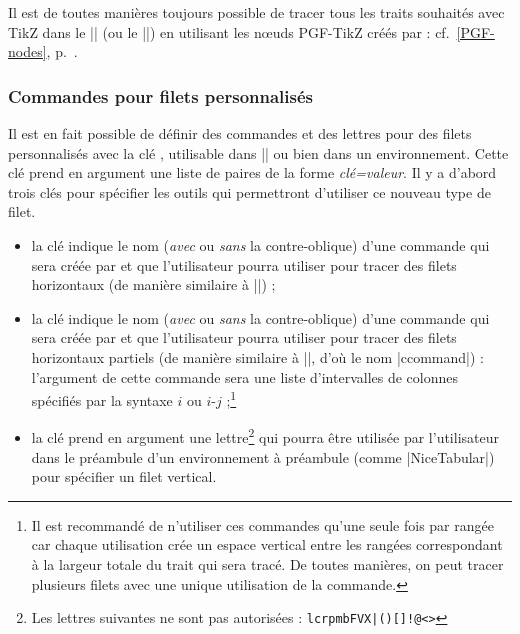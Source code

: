 \documentclass[dvipsnames]{article}
\begin{document}
\medskip
Il est de toutes manières toujours possible de tracer tous les traits souhaités
avec TikZ dans le |\CodeAfter| (ou le |\CodeBefore|) en utilisant les nœuds
PGF-TikZ créés par  : cf.~\ref{PGF-nodes}, p.~\pageref{PGF-nodes}.

\subsubsection{Commandes pour filets personnalisés}
\label{custom-line}


Il est en fait possible de définir des commandes et des lettres pour des filets
personnalisés avec la clé , utilisable dans
|\NiceMatrixOptions| ou bien dans un environnement. Cette clé prend en argument
une liste de paires de la forme \textsl{clé=valeur}. Il y a d'abord trois clés
pour spécifier les outils qui permettront d'utiliser ce nouveau type de filet.

\begin{itemize}
\item la clé  indique le nom (\emph{avec} ou \emph{sans} la
contre-oblique) d'une commande qui sera créée par  et que
l'utilisateur pourra utiliser pour tracer des filets horizontaux (de manière
similaire à |\hline|) ;

\item la clé  indique le nom (\emph{avec} ou \emph{sans} la
contre-oblique) d'une commande qui sera créée par  et que
l'utilisateur pourra utiliser pour tracer des filets horizontaux partiels (de
manière similaire à |\cline|, d'où le nom |ccommand|) : l'argument de cette
commande sera une liste d'intervalles de colonnes spécifiés par la syntaxe $i$ ou
$i$-$j$ ;\footnote{Il est recommandé de n'utiliser ces commandes qu'une seule
  fois par rangée car chaque utilisation crée un espace vertical entre les
  rangées correspondant à la largeur totale du trait qui sera tracé. De toutes
  manières, on peut tracer plusieurs filets avec une unique utilisation de la
  commande.}

\item la clé  prend en argument une lettre\footnote{Les lettres
  suivantes ne sont pas autorisées : \verb+lcrpmbFVX|()[]!@<>+} qui pourra être
utilisée par l'utilisateur dans le préambule d'un environnement à préambule
(comme |{NiceTabular}|) pour spécifier un filet vertical.
\end{itemize}
\end{document}
